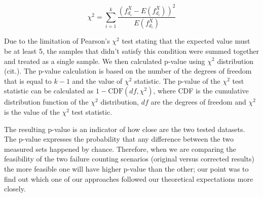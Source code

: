 \documentclass[
  digital,  	%
  color,		%
  oneside,   	%
  12pt,
  nocover,
  notable,
  nolof,
  nolot,
]{fithesis3}
\theoremstyle{definition}
\theoremstyle{remark}
\begin{document}
\begin{equation}
\label{eq:chi_square_stat}
\chi^2 = \sum\limits_{i=1}^{k} \frac{  \left(f_{d_i}^{X} - E \left(f_{d_i}^{X}\right) \right)^2 }{E \left(f_{d_i}^{X}\right)}
\end{equation}

Due to the limitation of Pearson's $\chi^2$ test stating that the expected value must be at least 5, the samples that didn't satisfy this condition were summed together and treated as a single sample. We then calculated p-value using $\chi^2$ distribution (cit.). The p-value calculation is based on the number of the degrees of freedom that is equal to $k-1$ and the value of $\chi^2$ statistic. The p-value of the $\chi^2$ test statistic can be calculated as $1 - \text{CDF}(df, \chi^2)$, where CDF is the cumulative distribution function of the $\chi^2$ distribution, $df$ are the degrees of freedom and $\chi^2$ is the value of the $\chi^2$ test statistic.

The resulting p-value is an indicator of how close are the two tested datasets. The p-value expresses the probability that any difference between the two measured sets happened by chance. Therefore, when we are comparing the feasibility of the two failure counting scenarios (original versus corrected results) the more feasible one will have higher p-value than the other; our point was to find out which one of our approaches followed our theoretical expectations more closely.
\end{document}
